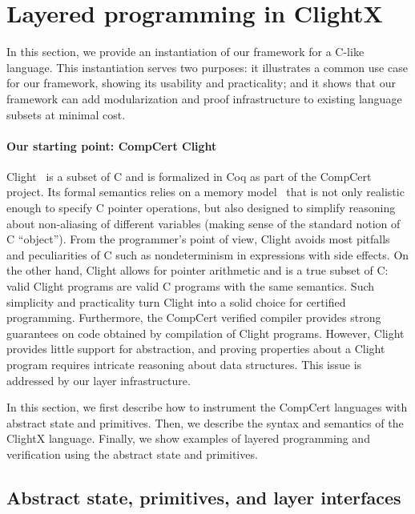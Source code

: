 \section{Layered programming in ClightX}
\label{sec:clight}

In this section, we provide an instantiation of our framework for a
C-like language. This instantiation serves two purposes: it
illustrates a common use case for our framework, showing its usability
and practicality; and it shows that our framework can add
modularization and proof infrastructure to existing language subsets
at minimal cost.

\paragraph{Our starting point: CompCert Clight}

Clight~\cite{blazy-leroy-clight} is a subset of C and is
formalized in Coq as part of the CompCert project.  Its formal
semantics relies on a memory model~\cite{leroy08} that is not only
realistic enough to specify C pointer operations, but also designed to
simplify reasoning about non-aliasing of different
variables (making sense of the standard notion of C ``object'').
From the programmer's point of view, 
Clight avoids most pitfalls and peculiarities of C such
as nondeterminism in expressions with side effects. 
On the other hand,
Clight allows for pointer arithmetic and is a true subset of C: valid
Clight programs are valid C programs with the same semantics.
Such
simplicity and practicality turn Clight into a solid choice for
certified programming.
Furthermore,
the CompCert verified compiler
provides strong guarantees on code
obtained by compilation of Clight programs.
However, Clight provides little support for abstraction,
and proving properties
about a Clight program requires intricate reasoning about
data structures. This issue is addressed by our layer infrastructure.


In this section, we first describe how to instrument the CompCert
languages with abstract state and primitives. Then, we describe the
syntax and semantics of the ClightX language. Finally, we show
examples of layered programming and verification using the abstract
state and primitives.

\subsection{Abstract state, primitives, and layer interfaces}

